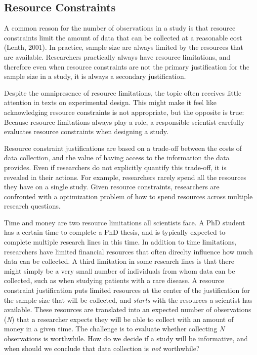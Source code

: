 \documentclass[
  english,
  ,jou, a4paper,floatsintext]{apa6}
\begin{document}
\hypertarget{resource-constraints}{%
\subsection{Resource Constraints}\label{resource-constraints}}

A common reason for the number of observations in a study is that resource constraints limit the amount of data that can be collected at a reasonable cost (Lenth, 2001). In practice, sample size are always limited by the resources that are available. Researchers practically always have resource limitations, and therefore even when resource constraints are not the primary justification for the sample size in a study, it is always a secondary justification.

Despite the omnipresence of resource limitations, the topic often receives little attention in texts on experimental design. This might make it feel like acknowledging resource constraints is not appropriate, but the opposite is true: Because resource limitations always play a role, a responsible scientist carefully evaluates resource constraints when designing a study.

Resource constraint justifications are based on a trade-off between the costs of data collection, and the value of having access to the information the data provides. Even if researchers do not explicitly quantify this trade-off, it is revealed in their actions. For example, researchers rarely spend all the resources they have on a single study. Given resource constraints, researchers are confronted with a optimization problem of how to spend resources across multiple research questions.

Time and money are two resource limitations all scientists face. A PhD student has a certain time to complete a PhD thesis, and is typically expected to complete multiple research lines in this time. In addition to time limitations, researchers have limited financial resources that often direclty influence how much data can be collected. A third limitation in some research lines is that there might simply be a very small number of individuals from whom data can be collected, such as when studying patients with a rare disease. A resource constraint justification puts limited resources at the center of the justification for the sample size that will be collected, and \emph{starts} with the resources a scientist has available. These resources are translated into an expected number of observations (\emph{N}) that a researcher expects they will be able to collect with an amount of money in a given time. The challenge is to evaluate whether collecting \emph{N} observations is worthwhile. How do we decide if a study will be informative, and when should we conclude that data collection is \emph{not} worthwhile?
\end{document}
